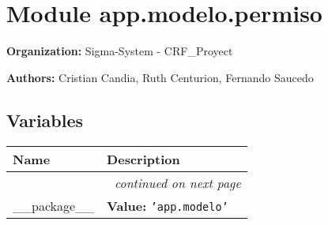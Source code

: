 %
%
%


\section{Module app.modelo.permiso}

    \label{app:modelo:permiso}
\textbf{Organization:} Sigma-System - CRF\_Proyect



\textbf{Authors:}
Cristian Candia,
    Ruth Centurion,
    Fernando Saucedo



  \subsection{Variables}

    \vspace{-1cm}
\hspace{\varindent}\begin{longtable}{|p{\varnamewidth}|p{\vardescrwidth}|l}
\cline{1-2}
\cline{1-2} \centering \textbf{Name} & \centering \textbf{Description}& \\
\cline{1-2}
\endhead\cline{1-2}\multicolumn{3}{r}{\small\textit{continued on next page}}\\\endfoot\cline{1-2}
\endlastfoot\raggedright \_\-\_\-p\-a\-c\-k\-a\-g\-e\-\_\-\_\- & \raggedright \textbf{Value:} 
{\tt \texttt{'}\texttt{app.modelo}\texttt{'}}&\\
\cline{1-2}
\end{longtable}



